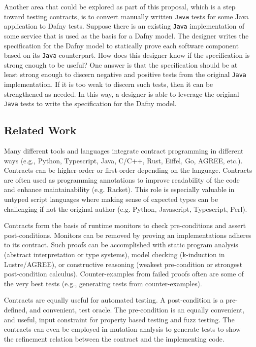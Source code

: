 \documentclass[11pt,onecolumn,notitlepage]{article}
\begin{document}
Another area that could be explored as part of this proposal, which is a step toward testing contracts, is to convert manually written \texttt{Java} tests for some Java application to Dafny tests. Suppose there is an existing \texttt{Java} implementation of some service that is used as the basis for a Dafny model. The designer writes the specification for the Dafny model to statically prove each software component based on its \texttt{Java} counterpart. How does this designer know if the specification is strong enough to be useful? One answer is that the specification should be at least strong enough to discern negative and positive tests from the original \texttt{Java} implementation. If it is too weak to discern such tests, then it can be strengthened as needed. In this way, a designer is able to leverage the original \texttt{Java} tests to write the specification for the Dafny model.
 
\subsection*{Related Work}

Many different tools and languages integrate contract programming in different ways (e.g., Python, Typescript, Java, C/C++, Rust, Eiffel, Go, AGREE, etc.). Contracts can be higher-order or first-order depending on the language. Contracts are often used as programming annotations to improve readability of the code and enhance maintainability (e.g. Racket). This role is especially valuable in untyped script languages where making sense of expected types can be challenging if not the original author (e.g. Python, Javascript, Typescript, Perl). 

Contracts form the basis of runtime monitors to check pre-conditions and assert post-conditions. Monitors can be removed by proving an implementations adheres to its contract. Such proofs can be accomplished with static program analysis (abstract interpretation or type systems), model checking (k-induction in Lustre/AGREE), or constructive reasoning (weakest pre-condition or strongest post-condition calculus). Counter-examples from failed proofs often are some of the very best tests (e.g., generating tests from counter-examples).

Contracts are equally useful for automated testing. A post-condition is a pre-defined, and convenient, test oracle. The pre-condition is an equally convenient, and useful, input constraint for property based testing and fuzz testing. The contracts can even be employed in mutation analysis to generate tests to show the refinement relation between the contract and the implementing code. 
\end{document}
